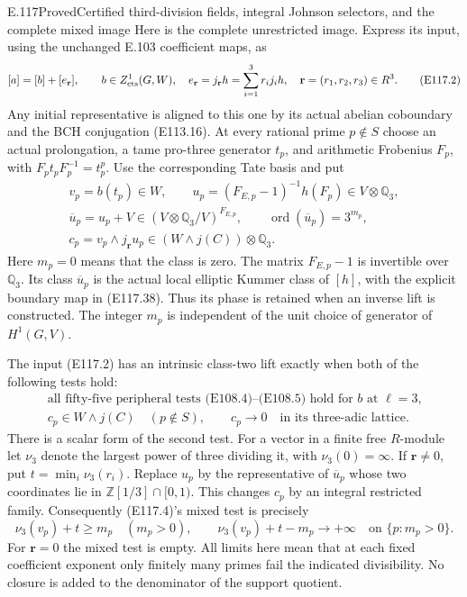 \begin{statement}{E.117}{Proved}{Certified third-division fields, integral Johnson selectors, and the complete mixed image}
Here is the complete unrestricted image.  Express its input,
using the unchanged E.103 coefficient maps, as
\[
 [a]=[b]+[e_{\mathbf r}],\qquad
 b\in Z^1_{\rm cts}(G,W),\quad
 e_{\mathbf r}=j_{\mathbf r}h=\sum_{i=1}^3r_i j_i h,
 \quad\mathbf r=(r_1,r_2,r_3)\in R^3.
 \tag{E117.2}
\]
Any initial representative is aligned to this one by its actual
abelian coboundary and the BCH conjugation (E113.16).
At every rational prime $p\notin S$ choose an actual prolongation,
a tame pro-three generator $t_p$, and arithmetic Frobenius $F_p$,
with $F_pt_pF_p^{-1}=t_p^p$.
Use the corresponding Tate basis and put
\[
 \begin{gathered}
 v_p=b(t_p)\in W,\qquad
 u_p=(F_{E,p}-1)^{-1}h(F_p)\in V\otimes\mathbb Q_3,\\
 \overline u_p=u_p+V\in(V\otimes\mathbb Q_3/V)^{F_{E,p}},
 \qquad \operatorname{ord}(\overline u_p)=3^{m_p},\\
 c_p=v_p\wedge j_{\mathbf r}u_p\in
              (W\wedge j(C))\otimes\mathbb Q_3 .
 \end{gathered}
 \tag{E117.3}
\]
Here $m_p=0$ means that the class is zero.
The matrix $F_{E,p}-1$ is invertible over $\mathbb Q_3$.
Its class $\overline u_p$ is the actual local elliptic
Kummer class of $[h]$, with the explicit boundary map in
(E117.38).  Thus its phase is retained when an inverse lift
is constructed.  The integer $m_p$ is independent of the unit
choice of generator of $H^1(G,V)$.

The input (E117.2) has an intrinsic class-two lift exactly when
both of the following tests hold:
\[
 \begin{gathered}
 \text{all fifty-five peripheral tests (E108.4)--(E108.5)
       hold for $b$ at $\ell=3$,}\\
 c_p\in W\wedge j(C)\quad(p\notin S),\qquad
 c_p\longrightarrow0\quad\text{in its three-adic lattice.}
 \end{gathered}
 \tag{E117.4}
\]
There is a scalar form of the second test.  For a vector in
a finite free $R$-module let $\nu_3$ denote the largest power
of three dividing it, with $\nu_3(0)=\infty$.
If $\mathbf r\ne0$, put $t=\min_i\nu_3(r_i)$.
Replace $u_p$ by the representative of $\overline u_p$ whose
two coordinates lie in $\mathbb Z[1/3]\cap[0,1)$.
This changes $c_p$ by an integral restricted family.
Consequently (E117.4)'s mixed test is precisely
\[
 \nu_3(v_p)+t\ge m_p\quad(m_p>0),\qquad
 \nu_3(v_p)+t-m_p\longrightarrow+\infty
                         \quad\text{on $\{p:m_p>0\}$.}
 \tag{E117.5}
\]
For $\mathbf r=0$ the mixed test is empty.
All limits here mean that at each fixed coefficient exponent
only finitely many primes fail the indicated divisibility.
No closure is added to the denominator of the support quotient.


\end{statement}
